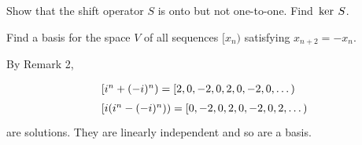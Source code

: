 \begin{multicols}{2}
\begin{ex}
Show that the shift operator $S$ is onto but not one-to-one. Find $\thinspace\operatorname{ker \medspace}S$.
\end{ex}

\begin{ex}
Find a basis for the space $V$ of all sequences $[x_{n})$ satisfying $x_{n+2} = -x_{n}$.

\begin{sol}
By Remark 2,
\begin{equation*}
\def\arraystretch{1.5}
\begin{array}{l}
\left[i^n + (-i)^n\right) = \left[2, 0, -2, 0, 2, 0, -2, 0, \dots \right) \\
\left[i(i^n - (-i)^n)\right) = \left[0, -2, 0, 2, 0, -2, 0, 2, \dots \right)
\end{array}
\end{equation*}
are solutions. They are linearly independent and so are a basis.
\end{sol}
\end{ex}
\end{multicols}
